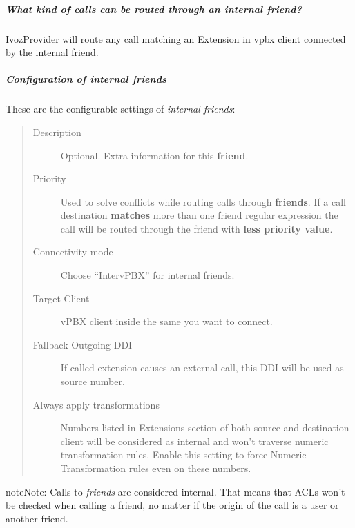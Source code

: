 \documentclass[letterpaper,10pt,english]{sphinxmanual}
\begin{document}
\subparagraph{What kind of calls can be routed through an \emph{internal friend}?}
\label{administration_portal/client/vpbx/routing_endpoints/friends/internal_friends:what-kind-of-calls-can-be-routed-through-an-internal-friend}
IvozProvider will route any call matching an Extension in vpbx client connected by the internal friend.


\subparagraph{Configuration of internal friends}
\label{administration_portal/client/vpbx/routing_endpoints/friends/internal_friends:configuration-of-internal-friends}
These are the configurable settings of \emph{internal friends}:
\begin{quote}
\begin{description}
\item[{Description}] \leavevmode
Optional. Extra information for this \textbf{friend}.

\item[{Priority}] \leavevmode
Used to solve conflicts while routing calls through \textbf{friends}.
If a call destination \textbf{matches} more than one friend regular expression
the call will be routed through the friend with \textbf{less priority value}.

\item[{Connectivity mode}] \leavevmode
Choose ``IntervPBX'' for internal friends.

\item[{Target Client}] \leavevmode
vPBX client inside the same {\hyperref[administration_portal/brand/settings/corporations:corporations]{}} you want to connect.

\item[{Fallback Outgoing DDI}] \leavevmode
If called extension causes an external call, this DDI will be used as source number.

\item[{Always apply transformations}] \leavevmode
Numbers listed in Extensions section of both source and destination client will be considered as internal and
won't traverse numeric transformation rules. Enable this setting to force Numeric Transformation rules even on these numbers.

\end{description}
\end{quote}

\begin{notice}{note}{Note:}
Calls to \emph{friends} are considered internal. That means that ACLs won't
be checked when calling a friend, no matter if the origin of the call
is a user or another friend.
\end{notice}
\end{document}
